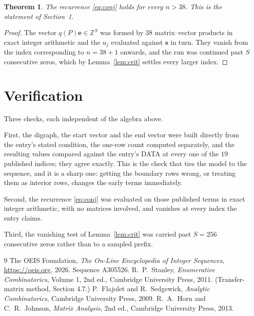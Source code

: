 \documentclass[11pt,a4paper]{article}
\theoremstyle{plain}
\newtheorem{theorem}{Theorem}
\theoremstyle{definition}
\begin{document}
\begin{theorem}
The recurrence \eqref{eq:conj} holds for every $n>38$. This is the statement of
Section~1.
\end{theorem}

\begin{proof}
The vector $q(P)\mathbf{e}\in\mathbb{Z}^{S}$ was formed by $38$ matrix--vector
products in exact integer arithmetic and the $u_j$ evaluated against $\mathbf{s}$ in turn.
They vanish from the index corresponding to $n=38+1$ onwards, and the run was continued
past $S$ consecutive zeros, which by Lemma~\ref{lem:crit} settles every larger index.
\end{proof}

\section{Verification}

Three checks, each independent of the algebra above.

First, the digraph, the start vector and the end vector were built directly from the
entry's stated condition, the one-row count computed separately, and the resulting values
compared against the entry's DATA at every one of the $19$ published indices; they
agree exactly. This is the check that ties the model to the sequence, and it is a sharp one:
getting the boundary rows wrong, or treating them as interior rows, changes the early terms
immediately.

Second, the recurrence \eqref{eq:conj} was evaluated on those published terms in exact
integer arithmetic, with no matrices involved, and vanishes at every index the entry claims.

Third, the vanishing test of Lemma~\ref{lem:crit} was carried past $S=256$ consecutive
zeros rather than to a sampled prefix.

\begin{thebibliography}{9}
 The OEIS Foundation, \emph{The On-Line Encyclopedia of Integer
Sequences}, \url{https://oeis.org}, 2026. Sequence A305526.
 R.~P.~Stanley, \emph{Enumerative Combinatorics}, Volume 1, 2nd ed.,
Cambridge University Press, 2011. (Transfer-matrix method, Section 4.7.)
 P.~Flajolet and R.~Sedgewick, \emph{Analytic Combinatorics}, Cambridge
University Press, 2009.
 R.~A.~Horn and C.~R.~Johnson, \emph{Matrix Analysis}, 2nd ed., Cambridge
University Press, 2013.
\end{thebibliography}
\end{document}
